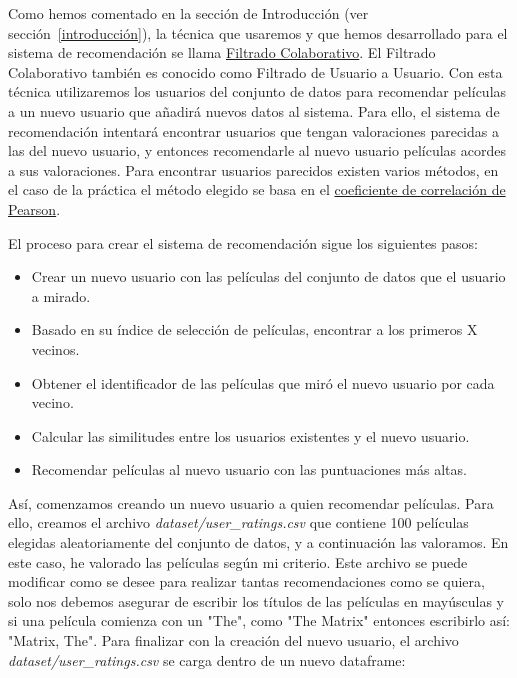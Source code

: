 \documentclass{uimppracticas}
\begin{document}
Como hemos comentado en la sección de Introducción (ver sección~\ref{introducción}), la técnica que usaremos y que hemos desarrollado para el sistema de recomendación se llama \href{https://es.wikipedia.org/wiki/Filtrado_colaborativo}{Filtrado Colaborativo}. El Filtrado Colaborativo también es conocido como Filtrado de Usuario a Usuario. Con esta técnica utilizaremos los usuarios del conjunto de datos para recomendar películas a un nuevo usuario que añadirá nuevos datos al sistema. Para ello, el sistema de recomendación intentará encontrar usuarios que tengan valoraciones parecidas a las del nuevo usuario, y entonces recomendarle al nuevo usuario películas acordes a sus valoraciones. Para encontrar usuarios parecidos existen varios métodos, en el caso de la práctica el método elegido se basa en el \href{https://es.wikipedia.org/wiki/Coeficiente_de_correlaci\%C3\%B3n_de_Pearson}{coeficiente de correlación de Pearson}. 

El proceso para crear el sistema de recomendación sigue los siguientes pasos:

\begin{itemize}
	\item Crear un nuevo usuario con las películas del conjunto de datos que el usuario a mirado.
	\item Basado en su índice de selección de películas, encontrar a los primeros X vecinos.
	\item Obtener el identificador de las películas que miró el nuevo usuario por cada vecino.
	\item Calcular las similitudes entre los usuarios existentes y el nuevo usuario.
	\item Recomendar películas al nuevo usuario con las puntuaciones más altas.
\end{itemize}

Así, comenzamos creando un nuevo usuario a quien recomendar películas. Para ello, creamos el archivo \textit{dataset/user\_ratings.csv} que contiene 100 películas elegidas aleatoriamente del conjunto de datos, y a continuación las valoramos. En este caso, he valorado las películas según mi criterio. Este archivo se puede modificar como se desee para realizar tantas recomendaciones como se quiera, solo nos debemos asegurar de escribir los títulos de las películas en mayúsculas y si una película comienza con un "The", como "The Matrix" entonces escribirlo así: "Matrix, The". Para finalizar con la creación del nuevo usuario, el archivo \textit{dataset/user\_ratings.csv} se carga dentro de un nuevo dataframe:
\end{document}
